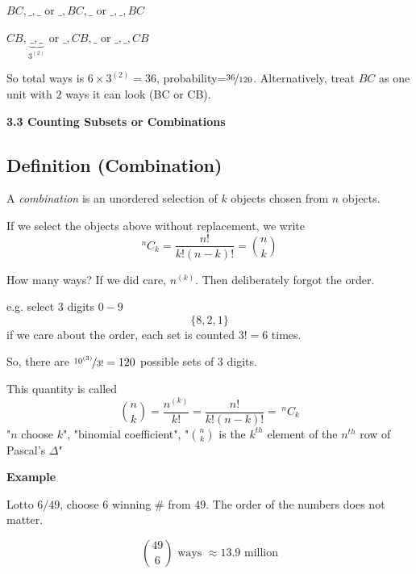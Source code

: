 $ BC,\_,\_ $ or $ \_,BC,\_ $ or $ \_,\_,BC $

$ CB,\underbrace{\_,\_}_{3^{(2)}} $ or $ \_,CB,\_ $ or $ \_,\_,CB $

So total ways is $ 6\times 3^{(2)}=36 $, probability=$ \nicefrac{36}{120} $.
Alternatively, treat $ BC $ as one unit with $ 2 $ ways it can look
(BC or CB).

\textbf{3.3 Counting Subsets or Combinations}

\begin{defbox}
    \subsection{Definition (Combination)}
    A \emph{combination} is an unordered selection of $ k $
    objects chosen from $ n $ objects.

    If we select the objects above without replacement, we write
    \[ ^nC_k=\frac{n!}{k!(n-k)!}=\binom{n}{k} \]
\end{defbox}

How many ways? If we did care, $ n^{(k)} $. Then deliberately forgot the order.

e.g. select $ 3 $ digits $ 0-9 $
\[ \{8,2,1\} \]
if we care about the order, each set is counted $ 3!=6 $ times.

So, there are $ \nicefrac{10^{(3)}}{3!}=120 $ possible sets of $ 3 $ digits.

This quantity is called
\[ \binom{n}{k}=\frac{n^{(k)}}{k!}=\frac{n!}{k!(n-k)!}=\, ^nC_k \]
"$ n $ choose $ k $", "binomial coefficient",
"$ \binom{n}{k} $ is the $ k^{th} $ element of the $ n^{th} $ row of Pascal's
$ \Delta $"

\textbf{Example}

Lotto $ 6/49 $, choose $ 6 $ winning \# from $ 49 $. The order of the numbers
does not matter.

\[ \binom{49}{6}\text{ ways }\approx 13.9 \text{ million} \]
